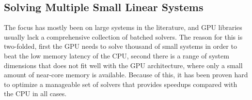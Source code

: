 \documentclass[journal]{IEEEtran}
\begin{document}



\subsection{Solving Multiple Small Linear Systems}
The focus has mostly been on large systems in the literature, and GPU libraries usually lack a comprehensive collection of batched solvers. The reason for this is two-folded, first the GPU needs to solve thousand of small systems in order to beat the low memory latency of the CPU, second there is a range of system dimensions that does not fit well with the GPU architecture, where only a small amount of near-core memory is available. Because of this, it has been proven hard to optimize a manageable set of solvers that provides speedups compared with the CPU in all cases.
\end{document}
